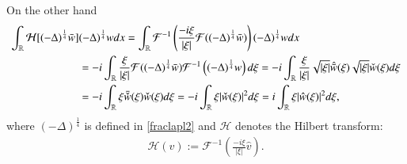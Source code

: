 \documentclass[12pt, a4paper]{article}
\newcommand{\M}[1]{\mathcal{#1}}
\newcommand{\R}{\mathbb{R}}
\newcommand{\red}[1]{{\color{red}#1}}
\renewcommand{\(}{\left(}
\renewcommand{\)}{\right)}
\begin{document}
On the other hand
 \begin{align}  \label{degintR2}
 \int_{\R}\mathcal{H}[(-\Delta)^\frac{1}{4}\bar w]& (-\Delta)^\frac{1}{4} w dx=\int_{\R}\mathcal{F}^{-1}\left(\frac{-i \xi}{|\xi|}\mathcal F((-\Delta)^\frac{1}{4}\bar w)\right) (-\Delta)^\frac{1}{4} w dx\notag \\
 &=-i\int_{\R}\frac{\xi}{|\xi|}\mathcal F((-\Delta)^\frac{1}{4}\bar w) \mathcal{F}^{-1}\left((-\Delta)^\frac{1}{4} w\right) d\xi= -i\int_\R\frac{\xi}{|\xi|}\sqrt{|\xi|}\hat{\bar w}(\xi)\sqrt{ |\xi|}\check w(\xi) d\xi\notag\\&=-i\int_\R \xi \bar{\check w}(\xi) \check w(\xi) d\xi =-i\int_\R \xi|\check w(\xi)|^2d\xi=i\int_\R \xi|\hat w(\xi)|^2d\xi ,\end{align} 
where $(-\Delta)^\frac{1}{4}$ is defined in \eqref{fraclapl2} and $\M{H}$ denotes the Hilbert transform:  \begin{align}\label{def-Hilbert-R} \mathcal H ({v}):=\mathcal F^{-1}\left(\frac{-i \xi}{|\xi|}\hat {{v}}\right) . \end{align}
\end{document}
